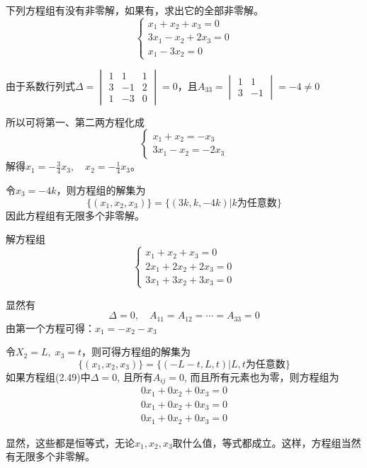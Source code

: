 \begin{example}
下列方程组有没有非零解，如果有，求出它的全部非零解。
\[\begin{cases}
    x_1+x_2+x_3=0\\ 3x_1-x_2+2x_3=0\\ x_1-3x_2=0
\end{cases}\]
\end{example}

\begin{solution}
    由于系数行列式$\Delta=\begin{vmatrix}
        1&1&1\\3&-1&2\\1&-3&0
    \end{vmatrix}=0$，且$A_{33}=\begin{vmatrix}
        1&1\\3&-1
    \end{vmatrix}=-4\ne 0$

所以可将第一、第二两方程化成
\[\begin{cases}
    x_1+x_2=-x_3\\
    3x_1-x_2=-2x_3
\end{cases}\]
解得$x_1=-\frac{3}{4}x_3,\quad x_2=-\frac{1}{4}x_3$。

令$x_3=-4k$，则方程组的解集为
\[\{(x_1,x_2,x_3)\}=\{(3k,k,-4k)|\text{$k$为任意数}\}\]
因此方程组有无限多个非零解。
\end{solution}

\begin{example}
解方程组\[\begin{cases}
    x_1+x_2+x_3=0\\
    2x_1+2x_2+2x_3=0\\
    3x_1+3x_2+3x_3=0
\end{cases}\]
\end{example}

\begin{solution}
显然有
\[\Delta=0,\quad A_{11}=A_{12}=\cdots=A_{33}=0\]
由第一个方程可得：$x_1=-x_2-x_3$

令$X_2=L,\; x_3=t$，则可得方程组的解集为
\[\{(x_1,x_2,x_3)\}=\{(-L-t,L,t)|\text{$L,t$为任意数}\}\]
如果方程组(2.49)中$\Delta=0$, 且所有$A_{ij}=0$, 而且所有元素也为零，则方程组为
\[\begin{split}
   0x_1+0x_2+0x_3=0\\
   0x_1+0x_2+0x_3=0\\
   0x_1+0x_2+0x_3=0 
\end{split}\]

显然，这些都是恒等式，无论$x_1,x_2,x_3$取什么值，等式都成立。这样，方程组当然有无限多个非零解。
\end{solution}

